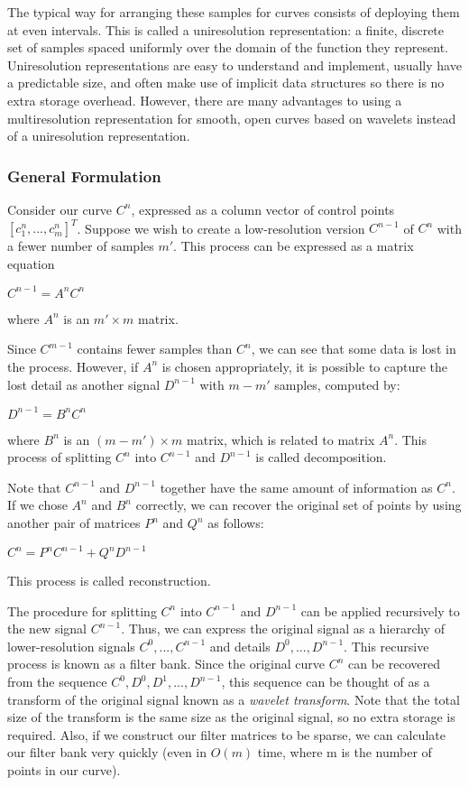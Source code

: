 \documentclass[11pt]{article}
\begin{document}
The typical way for arranging these samples for curves consists of deploying them at even intervals. This is called a uniresolution representation: a finite, discrete set of samples spaced uniformly over the domain of the function they represent. Uniresolution representations are easy to understand and implement, usually have a predictable size, and often make use of implicit data structures so there is no extra storage overhead. However, there are many advantages to using a multiresolution representation for smooth, open curves based on wavelets instead of a uniresolution representation.

\subsubsection{General Formulation}
\label{sec:generalformulation}
Consider our curve $C^{n}$, expressed as a column vector of control points $[c_{1}^{n}, ..., c_{m}^{n}]^{T}$. Suppose we wish to create a low-resolution version $C^{n-1}$ of $C^{n}$ with a fewer number of samples $m'$. This process can be expressed as a matrix equation
\begin{center}
$C^{n-1} = A^{n} C^{n}$
\end{center}
where $A^{n}$ is an $m' \times m$ matrix.

Since $C^{m-1}$ contains fewer samples than $C^{n}$, we can see that some data is lost in the process. However, if $A^{n}$ is chosen appropriately, it is possible to capture the lost detail as another signal $D^{n-1}$ with $m - m'$ samples, computed by:
\begin{center}
$D^{n-1} = B^{n} C^{n}$
\end{center}
where $B^{n}$ is an $(m - m') \times m$ matrix, which is related to matrix $A^{n}$. This process of splitting $C^{n}$ into $C^{n-1}$ and $D^{n-1}$ is called decomposition.

Note that $C^{n-1}$ and $D^{n-1}$ together have the same amount of information as $C^{n}$. If we chose $A^{n}$ and $B^{n}$ correctly, we can recover the original set of points by using another pair of matrices $P^{n}$ and $Q^{n}$ as follows:
\begin{center}
$C^{n} = P^{n} C^{n-1}  + Q^{n} D^{n-1}$
\end{center}
This process is called reconstruction.

The procedure for splitting $C^{n}$ into $C^{n-1}$ and $D^{n-1}$ can be applied recursively to the new signal $C^{n-1}$. Thus, we can express the original signal as a hierarchy of lower-resolution signals $C^{0}, ..., C^{n-1}$ and details $D^{0}, ..., D^{n-1}$. This recursive process is known as a filter bank. Since the original curve $C^{n}$ can be recovered from the sequence $C^{0}, D^{0}, D^{1}, ..., D^{n-1}$, this sequence can be thought of as a transform of the original signal known as a \emph{wavelet transform}. Note that the total size of the transform is the same size as the original signal, so no extra storage is required. Also, if we construct our filter matrices to be sparse, we can calculate our filter bank very quickly (even in $O(m)$ time, where m is the number of points in our curve).
\end{document}
